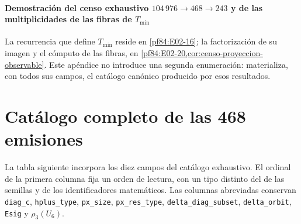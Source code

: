 \paragraph{Demostración del censo exhaustivo \(104\,976\to468\to243\) y de las multiplicidades de las fibras de \(T_{\min}\)}
La recurrencia que define \(T_{\min}\) reside en
\cref{pf84:E02-16}; la factorización de su imagen y el cómputo de las fibras,
en \cref{pf84:E02-20,cor:censo-proyeccion-observable}. Este apéndice no
introduce una segunda enumeración: materializa, con todos sus campos, el
catálogo canónico producido por esos resultados.

\section{Catálogo completo de las 468 emisiones}

La tabla siguiente incorpora los diez campos del catálogo exhaustivo. El
ordinal de la primera columna fija un orden de lectura, con un tipo distinto
del de las semillas y de los identificadores matemáticos. Las columnas
abreviadas conservan
\texttt{diag\_c}, \texttt{hplus\_type}, \texttt{px\_size},
\texttt{px\_res\_type}, \texttt{delta\_diag\_subset},
    \texttt{delta\_orbit}, \texttt{Esig} y \(\rho_3(U_6)\).


